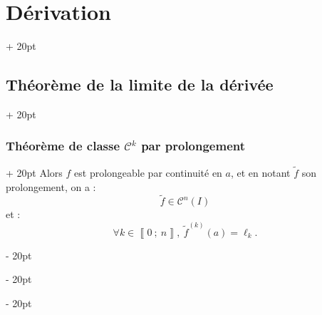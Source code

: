 \documentclass[a4paper, 12pt, twoside]{article}
\newcommand{\nset}[2]{\left\llbracket #1\ ;\ #2 \right\rrbracket}
\newcommand{\ind}[1][20pt]{\advance\leftskip + #1}
\newcommand{\deind}[1][20pt]{\advance\leftskip - #1}
\newenvironment{indt}[2][20pt]{#2 \par \ind[#1]}{\par \deind} %
\begin{document}
\begin{indt}{\section{Dérivation}}
\begin{indt}{\subsection{Théorème de la limite de la dérivée}}
\begin{indt}{\subsubsection{Théorème de classe $\mathcal C^k$ par prolongement}}
                Alors $f$ est prolongeable par continuité en $a$, et en notant $\widetilde f$ son prolongement, on a :
                \[
                    \widetilde f \in \mathcal C^n(I)
                \]
                et :
                \[
                    \forall k \in \nset 0 n,\
                    {\widetilde f}^{(k)}(a) = \ell_k.
                \]
            \end{indt}
        \end{indt}
    \end{indt}
    
    
    
\end{document}
